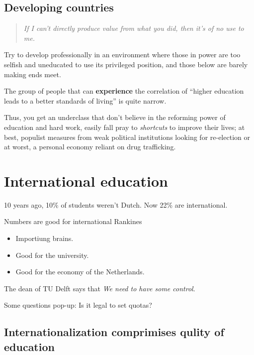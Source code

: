 \subsection{Developing countries} 



\begin{quote}
	\textit{If I can't directly produce value from what you did, then it's of no use to me.}
\end{quote}

Try to develop professionally in an environment where those in power are too selfish and uneducated to use its privileged position, and those below are barely making ends meet.

The group of people that can \textbf{experience} the correlation of ``higher education leads to a better standards of living'' is quite narrow.

Thus, you get an underclass that don't believe in the reforming power of education and hard work, easily fall pray to \textit{shortcuts} to improve their lives; at best, populist measures from weak political institutions looking for re-election or at worst, a personal economy reliant on drug trafficking.





\section{International education} \label{sec:international_education}

10 years ago,  10\% of students weren't Dutch. Now 22\% are international.

Numbers are good for international Rankines
\begin{itemize}
	\item Importiung brains.
	\item Good for the university.
	\item Good for the economy of the Netherlands.
\end{itemize}

The dean of TU Delft says that \textit{We need to have some control}.

Some questions pop-up: Is it legal to set quotas?



	\subsection{Internationalization comprimises qulity of education} 


